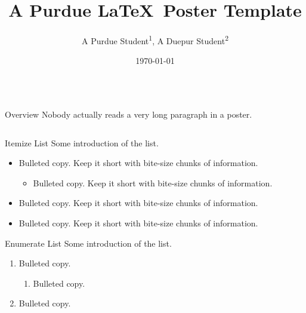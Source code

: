 \documentclass{purdue-poster}
\title{\Huge{A Purdue \LaTeX\ Poster Template}}
\author{\Large{A Purdue Student\texorpdfstring{\textsuperscript{1}}{}, A Duepur Student\texorpdfstring{\textsuperscript{2}}{}}}
\institute
{\large{Purdue University\texorpdfstring{\textsuperscript{1}}{}, Duepur University\texorpdfstring{\textsuperscript{2}},\\
Appearing at Overleaf Template}}
\date{\today}
\newlength{\postercolsep}
\newcommand{\postercolwidth}[1]{\dimeval{#1-\postercolsep}}
\begin{document}
\begin{frame}{}
\nointerlineskip
\begin{columns}[onlytextwidth, t]
    \begin{column}{\postercolwidth{.6\linewidth}}

        \begin{abstractblock}{Overview}
            Nobody actually reads a very long paragraph in a poster.

            \bigskip

            \lipsum[2]
        \end{abstractblock}

        \begin{columns}[onlytextwidth, t]
        
            \begin{column}{\postercolwidth{.5\linewidth}}
                
                \begin{plainblock}{Itemize List}
                    Some introduction of the list.
                    \begin{itemize}
                        \item Bulleted copy. Keep it short with bite-size chunks of information.
                        \begin{itemize}
                            \item Bulleted copy. Keep it short with bite-size chunks of information.
                        \end{itemize}
                        \item Bulleted copy. Keep it short with bite-size chunks of information.
                        \item Bulleted copy. Keep it short with bite-size chunks of information.
                    \end{itemize}
                \end{plainblock}
            
                \begin{plainblock}{Enumerate List}
                    Some introduction of the list.
                    \begin{enumerate}
                        \item Bulleted copy.
                        \begin{enumerate}
                            \item Bulleted copy.
                        \end{enumerate}
                        \item Bulleted copy.
                    \end{enumerate}
                \end{plainblock}


\end{column}
\end{columns}
\end{column}
\end{columns}
\end{frame}
\end{document}
